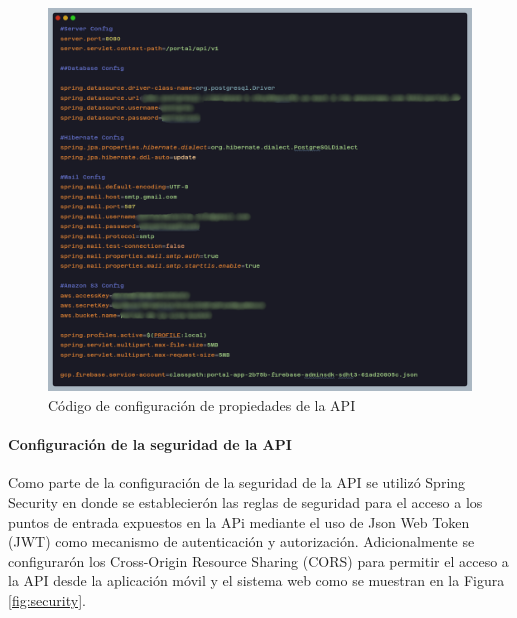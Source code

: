 \begin{figure}[H]
    \centering
    \includegraphics[width=1\textwidth]{resources/images/properties}
    \caption{Código de configuración de propiedades de la API}
    \label{fig:api-properties}
\end{figure}

\paragraph{Configuración de la seguridad de la API}

Como parte de la configuración de la seguridad de la API se utilizó Spring Security en donde se establecierón las reglas de seguridad para el acceso a los puntos de entrada expuestos en la APi mediante el uso de Json Web Token (JWT) como mecanismo de autenticación y autorización.
Adicionalmente se configurarón los Cross-Origin Resource Sharing (CORS) para permitir el acceso a la API desde la aplicación móvil y el sistema web como se muestran en la Figura \ref{fig:security}.

